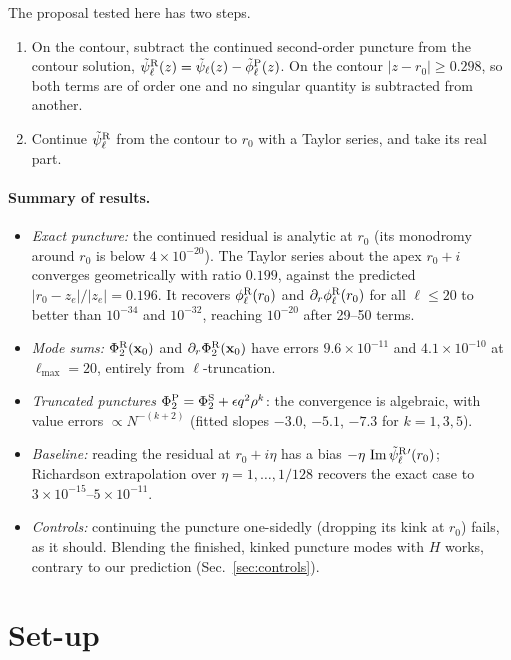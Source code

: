 \documentclass[11pt,a4paper]{article}
\renewcommand{\Im}{\operatorname{Im}}
\newcommand{\x}{\mathbf{x}}
\newcommand{\psiR}{\tilde\psi^{\rm R}_\ell}
\newcommand{\phiR}{\phi^{\rm R}_\ell}
\begin{document}
The proposal tested here has two steps.
\begin{enumerate}[leftmargin=*]
\item On the contour, subtract the continued second-order puncture from the contour solution, $\psiR(z)=\tilde\psi_\ell(z)-\tilde\phi^{\rm P}_\ell(z)$.
On the contour $|z-r_0|\ge0.298$, so both terms are of order one and no singular quantity is subtracted from another.
\item Continue $\psiR$ from the contour to $r_0$ with a Taylor series, and take its real part.
\end{enumerate}

\paragraph{Summary of results.}
\begin{itemize}[leftmargin=*]
\item \emph{Exact puncture:} the continued residual is analytic at $r_0$ (its monodromy around $r_0$ is below $4\times10^{-20}$).
The Taylor series about the apex $r_0+i$ converges geometrically with ratio $0.199$, against the predicted $|r_0-z_e|/|z_e|=0.196$.
It recovers $\phiR(r_0)$ and $\partial_r\phiR(r_0)$ for all $\ell\le20$ to better than $10^{-34}$ and $10^{-32}$, reaching $10^{-20}$ after 29--50 terms.
\item \emph{Mode sums:} $\Phi_2^{\rm R}(\x_0)$ and $\partial_r\Phi_2^{\rm R}(\x_0)$ have errors $9.6\times10^{-11}$ and $4.1\times10^{-10}$ at $\ell_{\max}=20$, entirely from $\ell$-truncation.
\item \emph{Truncated punctures} $\Phi_2^{\rm P}=\Phi_2^{\rm S}+\epsilon q^2\rho^k$: the convergence is algebraic, with value errors $\propto N^{-(k+2)}$ (fitted slopes $-3.0$, $-5.1$, $-7.3$ for $k=1,3,5$).
\item \emph{Baseline:} reading the residual at $r_0+i\eta$ has a bias $-\eta\,\Im\psiR{}'(r_0)$; Richardson extrapolation over $\eta=1,\dots,1/128$ recovers the exact case to $3\times10^{-15}$--$5\times10^{-11}$.
\item \emph{Controls:} continuing the puncture one-sidedly (dropping its kink at $r_0$) fails, as it should.
Blending the finished, kinked puncture modes with $H$ works, contrary to our prediction (Sec.~\ref{sec:controls}).
\end{itemize}

\section{Set-up}\label{sec:setup}
\end{document}
